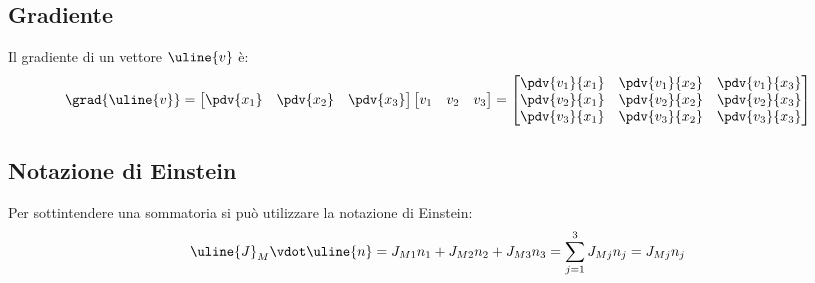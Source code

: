 \subsection*{Gradiente}
Il gradiente di un vettore $\uline{v}$ è:
	\begin{equation*}
			\grad{\uline{v}} = 
				\begin{bmatrix} 
					\pdv{x_1} & \pdv{x_2} & \pdv{x_3}
				\end{bmatrix}
				\begin{bmatrix} 
					v_1 & v_2 & v_3
				\end{bmatrix} 
					=
				\begin{bmatrix}
					\pdv{v_1}{x_1} & \pdv{v_1}{x_2} & \pdv{v_1}{x_3}\\
					\pdv{v_2}{x_1} & \pdv{v_2}{x_2} & \pdv{v_2}{x_3}\\
					\pdv{v_3}{x_1} & \pdv{v_3}{x_2} & \pdv{v_3}{x_3}\\
				\end{bmatrix}
	\end{equation*}


\subsection*{Notazione di Einstein}
Per sottintendere una sommatoria si può utilizzare la notazione di Einstein:
	\begin{equation*}
		\uline{J}_M \vdot \uline{n} = J_{M1} n_1 + J_{M2} n_2 + J_{M3} n_3 = \sum_{j=1}^{3} {J_{Mj} n_j} = J_{Mj} n_j
	\end{equation*}

